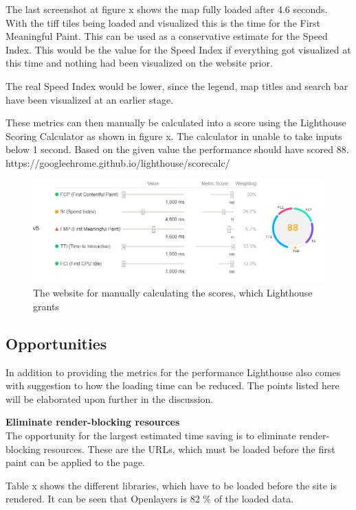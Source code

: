 The last screenshot at figure x shows the map fully loaded after 4.6 seconds. With the tiff tiles being loaded and visualized this is the time for the First Meaningful Paint. This can be used as a conservative estimate for the Speed Index. This would be the value for the Speed Index if everything got visualized at this time and nothing had been visualized on the website prior.

The real Speed Index would be lower, since the legend, map titles and search bar have been visualized at an earlier stage. 

These metrics can then manually be calculated into a score using the Lighthouse Scoring Calculator as shown in figure x. The calculator in unable to take inputs below 1 second. Based on the given value the performance should have scored 88.
https://googlechrome.github.io/lighthouse/scorecalc/

\begin{figure} [H]
	\centering
	\includegraphics[width=.8\textwidth]{Pictures/ScoringManual}
	\caption{The website for manually calculating the scores, which Lighthouse grants}
	\label{ScoringManual}
\end{figure}


\subsection{Opportunities}
In addition to providing the metrics for the performance Lighthouse also comes with suggestion to how the loading time can be reduced. The points listed here will be elaborated upon further in the discussion.

\textbf{Eliminate render-blocking resources}\\
The opportunity for the largest estimated time saving is to eliminate render-blocking resources. These are the URLs, which must be loaded before the first paint can be applied to the page. \citep{RenderBlocking}

Table x shows the different libraries, which have to be loaded before the site is rendered. It can be seen that Openlayers is 82 \% of the loaded data.


